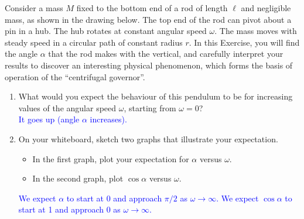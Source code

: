 \documentclass[11pt, letterpaper, openany]{book}
\newenvironment{exercise}[1][Exercise]{%
  \tcolorbox[blanker, breakable, left=1em,
    before skip=1em, after skip=1em,
    borderline west={3pt}{0pt}{PhysNavy},
    colback=PhysCream,
    before upper={\textcolor{PhysNavy}{\sffamily\bfseries #1:}\space}
  ]%
}{%
  \endtcolorbox%
}
\begin{document}
\begin{exercise}[Exercise 3: The Conical Pendulum]
Consider a mass $M$ fixed to the bottom end of a rod of length $\ell$ and negligible mass, as shown in the drawing below. The top end of the rod can pivot about a pin in a hub. The hub rotates at constant angular speed $\omega$. The mass moves with steady speed in a circular path of constant radius $r$. In this Exercise, you will find the angle $\alpha$ that the rod makes with the vertical, and carefully interpret your results to discover an interesting physical phenomenon, which forms the basis of operation of the ``centrifugal governor''.

\begin{center}
\end{center}

\begin{enumerate}[label=(\alph*)]
    \item What would you expect the behaviour of this pendulum to be for increasing values of the angular speed $\omega$, starting from $\omega = 0$? \\
    \textcolor{blue}{It goes up (angle $\alpha$ increases).}
    
    \item On your whiteboard, sketch two graphs that illustrate your expectation.
    \begin{itemize}
        \item In the first graph, plot your expectation for $\alpha$ versus $\omega$.
        \item In the second graph, plot $\cos\alpha$ versus $\omega$.
    \end{itemize}
    \textcolor{blue}{We expect $\alpha$ to start at 0 and approach $\pi/2$ as $\omega \to \infty$. We expect $\cos\alpha$ to start at 1 and approach 0 as $\omega \to \infty$.}
    

\end{enumerate}
\end{exercise}
\end{document}
